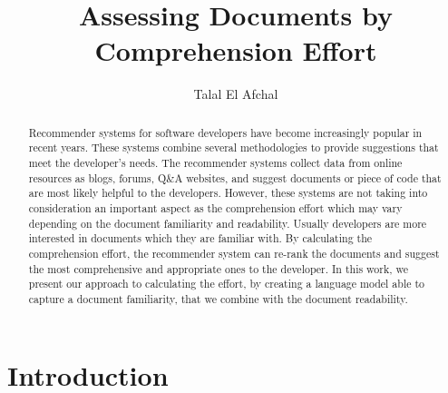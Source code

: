 \documentclass[12pt,mscthesis]{usiinfthesis}
\title{Assessing Documents by Comprehension Effort } %
\author{Talal El Afchal} %
\begin{document}
\maketitle %

\frontmatter %

\begin{abstract}
Recommender systems for software developers have become increasingly popular in recent years. These systems combine several methodologies to provide suggestions that meet the developer's needs. The recommender systems collect data from online resources as blogs, forums, Q\&A websites, and suggest documents or piece of code that are most likely helpful to the developers. However, these systems are not taking into consideration an important aspect as the comprehension effort which may vary depending on the document familiarity and readability. Usually developers are more interested in documents which they are familiar with. By calculating the comprehension effort, the recommender system can re-rank the documents and suggest the most comprehensive and appropriate ones to the developer. In this work, we present our approach to calculating the effort, by creating a language model able to capture a document familiarity, that we combine with the document readability. 
\end{abstract}

\begin{acknowledgements}
\end{acknowledgements}

\tableofcontents 
\listoffigures %
\listoftables %

\mainmatter

\chapter{Introduction}
\end{document}
